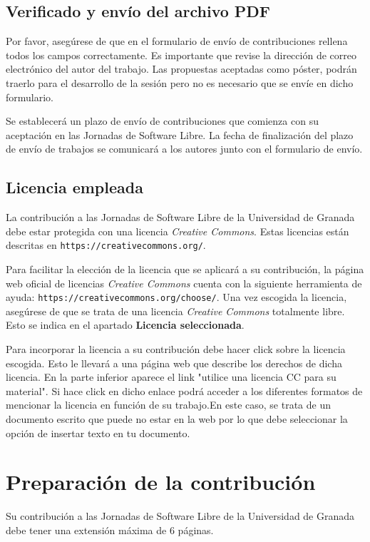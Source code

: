 \documentclass[runningheads,a4paper]{llncs}
\begin{document}
\subsection{Verificado y env\'{i}o del archivo PDF}
Por favor, asegúrese de que en el formulario de envío de contribuciones rellena todos los campos correctamente. Es importante que revise la dirección de correo electrónico del autor del trabajo. Las propuestas aceptadas como póster, podrán traerlo para el desarrollo de la sesión pero no es necesario que se envíe en dicho formulario.

Se establecerá un plazo de envío de contribuciones que comienza con su aceptación en las Jornadas de Software Libre. La fecha de finalización del plazo de envío de trabajos se comunicará a los autores junto con el formulario de envío.

\subsection{Licencia empleada}
La contribución a las Jornadas de Software Libre de la Universidad de Granada debe estar protegida con una licencia \textit{Creative Commons}. Estas licencias están descritas en \texttt{https://creativecommons.org/}.

Para facilitar la elección de la licencia que se aplicará a su contribución, la página web oficial de licencias \textit{Creative Commons} cuenta con la siguiente herramienta de ayuda: \texttt{https://creativecommons.org/choose/}. Una vez escogida la licencia, asegúrese de que se trata de una licencia \textit{Creative Commons} totalmente libre. Esto se indica en el apartado \textbf{Licencia seleccionada}.

Para incorporar la licencia a su contribución debe hacer click sobre la licencia escogida. Esto le llevará a una página web que describe los derechos de dicha licencia. En la parte inferior aparece el link "utilice una licencia CC para su material". Si hace click en dicho enlace podrá acceder a los diferentes formatos de mencionar la licencia en función de su trabajo.En este caso, se trata de un documento escrito que puede no estar en la web por lo que debe seleccionar la opción de insertar texto en tu documento.

\section{Preparación de la contribución}
Su contribución a las Jornadas de Software Libre de la Universidad de Granada debe tener una extensión máxima de 6 páginas.
\end{document}
